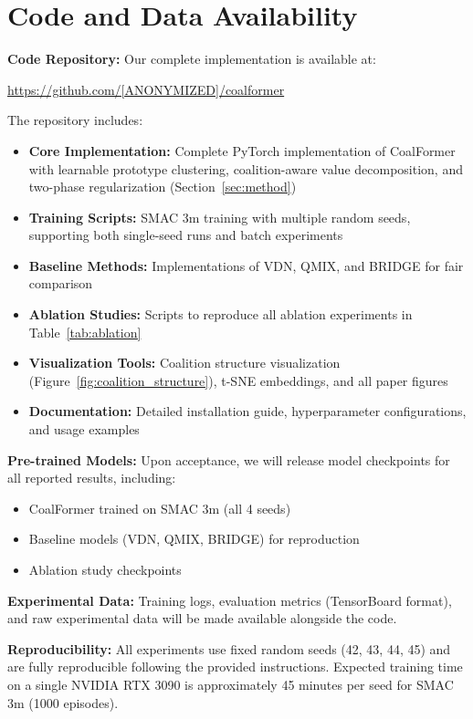 
\section{Code and Data Availability}
\label{app:code}

\textbf{Code Repository:} Our complete implementation is available at:

\begin{center}
\url{https://github.com/[ANONYMIZED]/coalformer}
\end{center}

The repository includes:
\begin{itemize}[leftmargin=*, itemsep=2pt]
    \item \textbf{Core Implementation:} Complete PyTorch implementation of CoalFormer with learnable prototype clustering, coalition-aware value decomposition, and two-phase regularization (Section~\ref{sec:method})
    \item \textbf{Training Scripts:} SMAC 3m training with multiple random seeds, supporting both single-seed runs and batch experiments
    \item \textbf{Baseline Methods:} Implementations of VDN, QMIX, and BRIDGE for fair comparison
    \item \textbf{Ablation Studies:} Scripts to reproduce all ablation experiments in Table~\ref{tab:ablation}
    \item \textbf{Visualization Tools:} Coalition structure visualization (Figure~\ref{fig:coalition_structure}), t-SNE embeddings, and all paper figures
    \item \textbf{Documentation:} Detailed installation guide, hyperparameter configurations, and usage examples
\end{itemize}

\textbf{Pre-trained Models:} Upon acceptance, we will release model checkpoints for all reported results, including:
\begin{itemize}[leftmargin=*, itemsep=2pt]
    \item CoalFormer trained on SMAC 3m (all 4 seeds)
    \item Baseline models (VDN, QMIX, BRIDGE) for reproduction
    \item Ablation study checkpoints
\end{itemize}

\textbf{Experimental Data:} Training logs, evaluation metrics (TensorBoard format), and raw experimental data will be made available alongside the code.

\textbf{Reproducibility:} All experiments use fixed random seeds (42, 43, 44, 45) and are fully reproducible following the provided instructions. Expected training time on a single NVIDIA RTX 3090 is approximately 45 minutes per seed for SMAC 3m (1000 episodes).

% 
